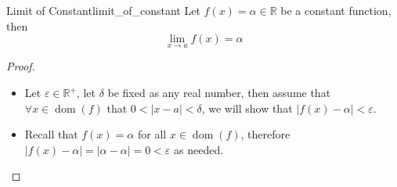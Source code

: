 \begin{proposition}{Limit of Constant}{limit_of_constant}
    Let $ f\left( x \right) = \alpha \in \mathbb{R}  $ be a constant function, then
    \[
        \lim_{ x \to a } f\left( x \right) = \alpha 
    \]
\end{proposition}

\begin{proof}
\begin{itemize}
    \item Let $ \varepsilon \in  \mathbb{R} ^{ +  }  $, let $ \delta  $ be fixed as any real number, then assume that $ \forall x \in  \operatorname{ dom  }\left( f \right)  $ that $ 0 < \left| x -  a \right| < \delta  $, we will show that $ \left| f\left( x \right) -  \alpha  \right| < \varepsilon  $. 
    \item Recall that $ f\left( x \right) = \alpha  $ for all $ x \in \operatorname{ dom }\left( f \right)  $, therefore $ \left| f\left( x \right) - \alpha  \right| =  \left| \alpha - \alpha  \right| =  0 < \varepsilon   $ as needed.
\end{itemize}
\end{proof}
